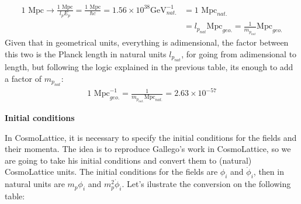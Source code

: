 \documentclass{article}
\begin{document}
\begin{align*}  
1 \text{ Mpc}\rightarrow \frac{1 \text{ Mpc}}{l_p E_p} = \frac{1 \text{ Mpc}}{\hbar c} = 1.56\times10^{38}\text{GeV}_{nat.}^{-1} &= 1 \text{ Mpc}_{nat.}\\
& = l_{p_{nat}}\text{Mpc}_{geo.} = \frac{1}{m_{p_{nat}}}\text{Mpc}_{geo.}
\end{align*}
Given that in geometrical units, everything is adimensional, the factor between this two is the Planck length in natural units $l_{p_{nat}}$, for going from adimensional to length, but following the logic explained in the previous table, its enough to add a factor of $m_{p_{nat}}$:
\begin{align*}
    1\text{ Mpc}^{-1}_{geo.} = \frac{1}{m_{p_{nat.}}\text{Mpc}_{nat.}}=2.63\times10^{-57}
\end{align*}


\textbf{Initial conditions}

In CosmoLattice, it is necessary to specify the initial conditions for the fields and their momenta. The idea is to reproduce Gallego's work in CosmoLattice, so we are going to take his initial conditions and convert them to (natural) CosmoLattice units. The initial conditions for the fields are $\phi_i$ and $\dot{\phi}_i$, then in natural units are $m_p\phi_i$ and $m_p^2\dot{\phi}_i$. Let's ilustrate the conversion on the following table:
\end{document}
